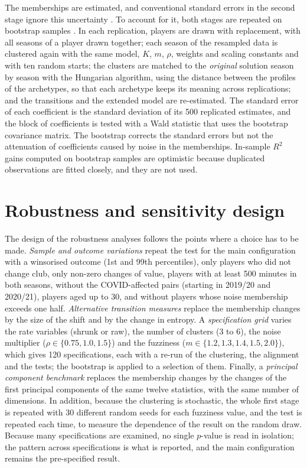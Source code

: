 The memberships are estimated, and conventional standard errors in the second stage ignore this uncertainty \cite{pagan1984econometric}. To account for it, both stages are repeated on bootstrap samples \cite{efron1979bootstrap}. In each replication, players are drawn with replacement, with all seasons of a player drawn together; each season of the resampled data is clustered again with the same model, $K$, $m$, $\rho$, weights and scaling constants and with ten random starts; the clusters are matched to the \emph{original} solution season by season with the Hungarian algorithm, using the distance between the profiles of the archetypes, so that each archetype keeps its meaning across replications; and the transitions and the extended model are re-estimated. The standard error of each coefficient is the standard deviation of its 500 replicated estimates, and the block of coefficients is tested with a Wald statistic that uses the bootstrap covariance matrix. The bootstrap corrects the standard errors but not the attenuation of coefficients caused by noise in the memberships. In-sample $R^2$ gains computed on bootstrap samples are optimistic because duplicated observations are fitted closely, and they are not used.

\section{Robustness and sensitivity design}
\label{sec:method-robustness}

The design of the robustness analyses follows the points where a choice has to be made. \emph{Sample and outcome variations} repeat the test for the main configuration with a winsorised outcome (1st and 99th percentiles), only players who did not change club, only non-zero changes of value, players with at least 500 minutes in both seasons, without the COVID-affected pairs (starting in 2019/20 and 2020/21), players aged up to 30, and without players whose noise membership exceeds one half. \emph{Alternative transition measures} replace the membership changes by the size of the shift and by the change in entropy. A \emph{specification grid} varies the rate variables (shrunk or raw), the number of clusters (3 to 6), the noise multiplier ($\rho\in\{0.75,1.0,1.5\}$) and the fuzziness ($m\in\{1.2,1.3,1.4,1.5,2.0\}$), which gives 120 specifications, each with a re-run of the clustering, the alignment and the tests; the bootstrap is applied to a selection of them. Finally, a \emph{principal component benchmark} replaces the membership changes by the changes of the first principal components of the same twelve statistics, with the same number of dimensions. In addition, because the clustering is stochastic, the whole first stage is repeated with 30 different random seeds for each fuzziness value, and the test is repeated each time, to measure the dependence of the result on the random draw. Because many specifications are examined, no single $p$-value is read in isolation; the pattern across specifications is what is reported, and the main configuration remains the pre-specified result.

